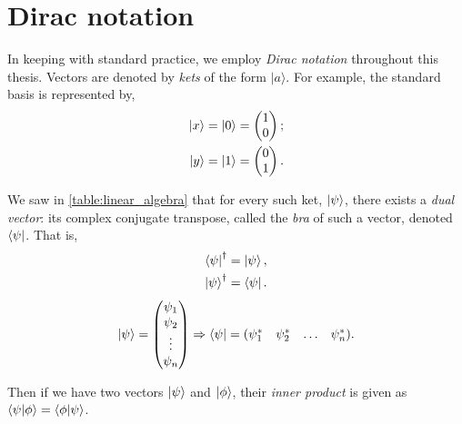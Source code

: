 \section{Dirac notation}\label{sec:dirac_notation}
In keeping with standard practice, we employ \emph{Dirac notation} throughout this thesis. 
Vectors are denoted by \emph{kets} of the form $|a\rangle$. 
For example, the standard basis is represented by, 
\begin{equation}
    \begin{split}
    \ket{x} =  \ket{0} &= \left(\begin{matrix}1\\0\end{matrix}\right);
    \\ \ket{y} = \ket{1} &= \left(\begin{matrix}0\\1\end{matrix}\right).
    \end{split}
\end{equation}
 
We saw in \cref{table:linear_algebra} that for every such ket, $\ket{\psi}$, there exists a \textit{dual vector}: 
    its complex conjugate transpose, called the \emph{bra} of such a vector, denoted $\bra{\psi}$. 
That is,
\begin{equation}
    \begin{split}
        \bra{\psi}^{\dag} &= \ket{\psi},
        \\ \ket{\psi} ^{\dag} &= \bra{\psi}.
    \end{split}
\end{equation}
\begin{equation}
    \ket{\psi} = \left(\begin{matrix}\psi_1 \\ \psi_2 \\ \vdots \\ \psi_n\end{matrix}\right) 
    \Rightarrow \bra{\psi}  = \begin{matrix}(\psi_1^{*} & \psi_2^{*} & \dots & \psi_n^{*})\end{matrix}.
\end{equation}

Then if we have two vectors $\ket{\psi} $ and $\ket{\phi}$, their \emph{inner product} is given as $ \braket{\psi | \phi}  = \braket{ \phi | \psi} $. 

